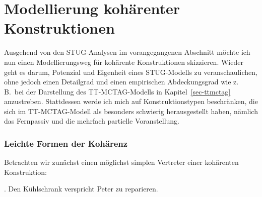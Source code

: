 \section{Modellierung kohärenter Konstruktionen} \label{sec-stug-kohaerenz}

Ausgehend von den STUG-Analysen im vorangegangenen Abschnitt möchte ich nun einen Modellierungsweg für kohärente Konstruktionen skizzieren. Wieder geht es darum, Potenzial und Eigenheit eines STUG-Modells zu veranschaulichen, ohne jedoch einen Detailgrad und einen empirischen Abdeckungsgrad wie z.\,B.\ bei der Darstellung des TT-MCTAG-Modells in Kapitel~\ref{sec-ttmctag} anzustreben. Stattdessen werde ich mich auf Konstruktionstypen beschränken, die sich im TT-MCTAG-Modell als besonders schwierig herausgestellt haben, nämlich das Fernpassiv und die mehrfach partielle Voranstellung.


\subsubsection*{Leichte Formen der Kohärenz}

Betrachten wir zunächst einen möglichst simplen Vertreter einer kohärenten Konstruktion: 

\ex. \label{ex-stug-5} Den Kühlschrank verspricht Peter zu reparieren.

